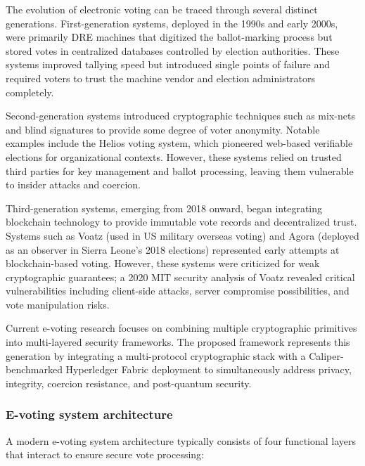 The evolution of electronic voting can be traced through several distinct generations. First-generation systems, deployed in the 1990s and early 2000s, were primarily DRE machines that digitized the ballot-marking process but stored votes in centralized databases controlled by election authorities. These systems improved tallying speed but introduced single points of failure and required voters to trust the machine vendor and election administrators completely.

Second-generation systems introduced cryptographic techniques such as mix-nets and blind signatures to provide some degree of voter anonymity. Notable examples include the Helios voting system, which pioneered web-based verifiable elections for organizational contexts. However, these systems relied on trusted third parties for key management and ballot processing, leaving them vulnerable to insider attacks and coercion.

Third-generation systems, emerging from 2018 onward, began integrating blockchain technology to provide immutable vote records and decentralized trust. Systems such as Voatz (used in US military overseas voting) and Agora (deployed as an observer in Sierra Leone's 2018 elections) represented early attempts at blockchain-based voting. However, these systems were criticized for weak cryptographic guarantees; a 2020 MIT security analysis of Voatz \cite{voatz_mit} revealed critical vulnerabilities including client-side attacks, server compromise possibilities, and vote manipulation risks.

Current e-voting research focuses on combining multiple cryptographic primitives into multi-layered security frameworks. The proposed framework represents this generation by integrating a multi-protocol cryptographic stack with a Caliper-benchmarked Hyperledger Fabric deployment to simultaneously address privacy, integrity, coercion resistance, and post-quantum security.

\subsubsection{E-voting system architecture}
\label{subsubsec:architecture}

A modern e-voting system architecture typically consists of four functional layers that interact to ensure secure vote processing:

